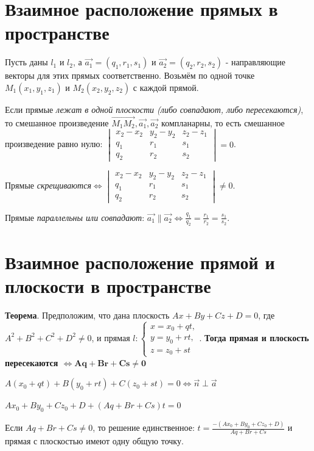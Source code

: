\documentclass[a4paper]{article}
\begin{document}
\section*{Взаимное расположение прямых в пространстве}
Пусть даны $l_1$ и $l_2$, а $\vec{a_1} = (q_1, r_1, s_1)$ и $\vec{a_2} = (q_2, r_2, s_2)$ - направляющие векторы для этих прямых соответственно. Возьмём по одной точке $M_1(x_1, y_1, z_1)$ и $M_2(x_2, y_2, z_2)$ с каждой прямой.

Если прямые \textit{лежат в одной плоскости (либо совпадают, либо пересекаются)}, то смешанное произведение $\overrightarrow{M_1M_2}, \vec{a_1}, \vec{a_2}$ компланарны, то есть смешанное произведение равно нулю: $\displaystyle \begin{vmatrix}
x_2-x_2& y_2-y_2& z_2-z_1\\
q_1& r_1& s_1\\
q_2& r_2& s_2
\end{vmatrix} = 0$.

Прямые \textit{скрещиваются}$\displaystyle \Leftrightarrow \begin{vmatrix}
x_2-x_2& y_2-y_2& z_2-z_1\\
q_1& r_1& s_1\\
q_2& r_2& s_2
\end{vmatrix} \neq 0$.

Прямые \textit{параллельны или совпадают}: $\displaystyle \vec{a_1} \parallel \vec{a_2} \Leftrightarrow \frac{q_1}{q_2} = \frac{r_1}{r_2} = \frac{s_1}{s_2}$.


\section*{Взаимное расположение прямой и плоскости в пространстве}
\textbf{Теорема}. Предположим, что дана плоскость $Ax+By+Cz+D=0$, где $A^2+B^2+C^2+D^2\neq 0$, и прямая $\displaystyle l: \begin{cases}
x=x_0+qt,
\\
y=y_0+rt,
\\
z=z_0+st
\end{cases}$. \textbf{Тогда прямая и плоскость пересекаются $\mathbf{\Leftrightarrow Aq+Br+Cs \neq 0}$}

$A(x_0 + qt) + B(y_0 + rt) + C(z_0 + st) = 0 \Leftrightarrow \vec{n} \perp \vec{a}$

$Ax_0 + By_0 + Cz_0 + D + (Aq+Br+Cs)t=0$

Если $Aq+Br+Cs \neq 0$, то решение единственное: $\displaystyle t = \frac{-(Ax_0 + By_0 + Cz_0 + D)}{Aq+Br+Cs}$ и прямая с плоскостью имеют одну общую точку.
\end{document}
